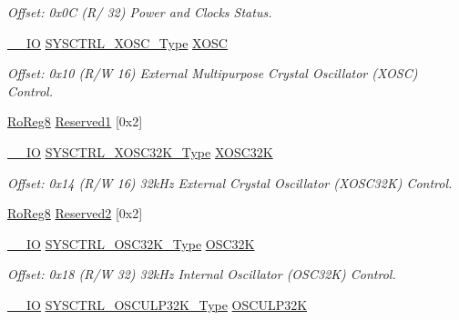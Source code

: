\begin{DoxyCompactItemize}
\begin{DoxyCompactList}\small\item\em Offset\+: 0x0C (R/ 32) Power and Clocks Status. \end{DoxyCompactList}\item 
\mbox{\hyperlink{core__cm0plus_8h_aec43007d9998a0a0e01faede4133d6be}{\+\_\+\+\_\+\+IO}} \mbox{\hyperlink{union_s_y_s_c_t_r_l___x_o_s_c___type}{S\+Y\+S\+C\+T\+R\+L\+\_\+\+X\+O\+S\+C\+\_\+\+Type}} \mbox{\hyperlink{struct_sysctrl_a704fdb07aa59f53bdff5052e95442f47}{X\+O\+SC}}
\begin{DoxyCompactList}\small\item\em Offset\+: 0x10 (R/W 16) External Multipurpose Crystal Oscillator (X\+O\+SC) Control. \end{DoxyCompactList}\item 
\mbox{\hyperlink{group___s_a_m_d21_e15_a__definitions_ga0d957f1433aaf5d70e4dc2b68288442d}{Ro\+Reg8}} \mbox{\hyperlink{struct_sysctrl_a3e42d171d4eb8eda7a030a3453f2d9c0}{Reserved1}} \mbox{[}0x2\mbox{]}
\item 
\mbox{\hyperlink{core__cm0plus_8h_aec43007d9998a0a0e01faede4133d6be}{\+\_\+\+\_\+\+IO}} \mbox{\hyperlink{union_s_y_s_c_t_r_l___x_o_s_c32_k___type}{S\+Y\+S\+C\+T\+R\+L\+\_\+\+X\+O\+S\+C32\+K\+\_\+\+Type}} \mbox{\hyperlink{struct_sysctrl_a1c2566d752a034eb2954bd034c10f749}{X\+O\+S\+C32K}}
\begin{DoxyCompactList}\small\item\em Offset\+: 0x14 (R/W 16) 32k\+Hz External Crystal Oscillator (X\+O\+S\+C32K) Control. \end{DoxyCompactList}\item 
\mbox{\hyperlink{group___s_a_m_d21_e15_a__definitions_ga0d957f1433aaf5d70e4dc2b68288442d}{Ro\+Reg8}} \mbox{\hyperlink{struct_sysctrl_a39c013121a741bab8d9442a891da19a7}{Reserved2}} \mbox{[}0x2\mbox{]}
\item 
\mbox{\hyperlink{core__cm0plus_8h_aec43007d9998a0a0e01faede4133d6be}{\+\_\+\+\_\+\+IO}} \mbox{\hyperlink{union_s_y_s_c_t_r_l___o_s_c32_k___type}{S\+Y\+S\+C\+T\+R\+L\+\_\+\+O\+S\+C32\+K\+\_\+\+Type}} \mbox{\hyperlink{struct_sysctrl_a4f03dd3c1354f85981f73e0210510533}{O\+S\+C32K}}
\begin{DoxyCompactList}\small\item\em Offset\+: 0x18 (R/W 32) 32k\+Hz Internal Oscillator (O\+S\+C32K) Control. \end{DoxyCompactList}\item 
\mbox{\hyperlink{core__cm0plus_8h_aec43007d9998a0a0e01faede4133d6be}{\+\_\+\+\_\+\+IO}} \mbox{\hyperlink{union_s_y_s_c_t_r_l___o_s_c_u_l_p32_k___type}{S\+Y\+S\+C\+T\+R\+L\+\_\+\+O\+S\+C\+U\+L\+P32\+K\+\_\+\+Type}} \mbox{\hyperlink{struct_sysctrl_adf5df9c96b0edb3eedc367c22440ed3b}{O\+S\+C\+U\+L\+P32K}}

\end{DoxyCompactItemize}
